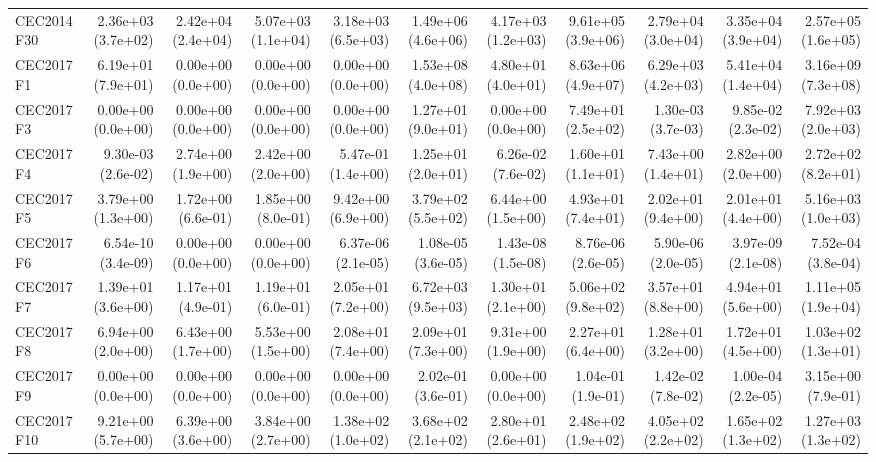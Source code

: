 \begin{longtable}{lrrrrrrrrrr}
CEC2014 F30 & 2.36e+03 (3.7e+02) & 2.42e+04 (2.4e+04) & 5.07e+03 (1.1e+04) & 3.18e+03 (6.5e+03) & 1.49e+06 (4.6e+06) & 4.17e+03 (1.2e+03) & 9.61e+05 (3.9e+06) & 2.79e+04 (3.0e+04) & 3.35e+04 (3.9e+04) & 2.57e+05 (1.6e+05) \\
CEC2017 F1 & 6.19e+01 (7.9e+01) & 0.00e+00 (0.0e+00) & 0.00e+00 (0.0e+00) & 0.00e+00 (0.0e+00) & 1.53e+08 (4.0e+08) & 4.80e+01 (4.0e+01) & 8.63e+06 (4.9e+07) & 6.29e+03 (4.2e+03) & 5.41e+04 (1.4e+04) & 3.16e+09 (7.3e+08) \\
CEC2017 F3 & 0.00e+00 (0.0e+00) & 0.00e+00 (0.0e+00) & 0.00e+00 (0.0e+00) & 0.00e+00 (0.0e+00) & 1.27e+01 (9.0e+01) & 0.00e+00 (0.0e+00) & 7.49e+01 (2.5e+02) & 1.30e-03 (3.7e-03) & 9.85e-02 (2.3e-02) & 7.92e+03 (2.0e+03) \\
CEC2017 F4 & 9.30e-03 (2.6e-02) & 2.74e+00 (1.9e+00) & 2.42e+00 (2.0e+00) & 5.47e-01 (1.4e+00) & 1.25e+01 (2.0e+01) & 6.26e-02 (7.6e-02) & 1.60e+01 (1.1e+01) & 7.43e+00 (1.4e+01) & 2.82e+00 (2.0e+00) & 2.72e+02 (8.2e+01) \\
CEC2017 F5 & 3.79e+00 (1.3e+00) & 1.72e+00 (6.6e-01) & 1.85e+00 (8.0e-01) & 9.42e+00 (6.9e+00) & 3.79e+02 (5.5e+02) & 6.44e+00 (1.5e+00) & 4.93e+01 (7.4e+01) & 2.02e+01 (9.4e+00) & 2.01e+01 (4.4e+00) & 5.16e+03 (1.0e+03) \\
CEC2017 F6 & 6.54e-10 (3.4e-09) & 0.00e+00 (0.0e+00) & 0.00e+00 (0.0e+00) & 6.37e-06 (2.1e-05) & 1.08e-05 (3.6e-05) & 1.43e-08 (1.5e-08) & 8.76e-06 (2.6e-05) & 5.90e-06 (2.0e-05) & 3.97e-09 (2.1e-08) & 7.52e-04 (3.8e-04) \\
CEC2017 F7 & 1.39e+01 (3.6e+00) & 1.17e+01 (4.9e-01) & 1.19e+01 (6.0e-01) & 2.05e+01 (7.2e+00) & 6.72e+03 (9.5e+03) & 1.30e+01 (2.1e+00) & 5.06e+02 (9.8e+02) & 3.57e+01 (8.8e+00) & 4.94e+01 (5.6e+00) & 1.11e+05 (1.9e+04) \\
CEC2017 F8 & 6.94e+00 (2.0e+00) & 6.43e+00 (1.7e+00) & 5.53e+00 (1.5e+00) & 2.08e+01 (7.4e+00) & 2.09e+01 (7.3e+00) & 9.31e+00 (1.9e+00) & 2.27e+01 (6.4e+00) & 1.28e+01 (3.2e+00) & 1.72e+01 (4.5e+00) & 1.03e+02 (1.3e+01) \\
CEC2017 F9 & 0.00e+00 (0.0e+00) & 0.00e+00 (0.0e+00) & 0.00e+00 (0.0e+00) & 0.00e+00 (0.0e+00) & 2.02e-01 (3.6e-01) & 0.00e+00 (0.0e+00) & 1.04e-01 (1.9e-01) & 1.42e-02 (7.8e-02) & 1.00e-04 (2.2e-05) & 3.15e+00 (7.9e-01) \\
CEC2017 F10 & 9.21e+00 (5.7e+00) & 6.39e+00 (3.6e+00) & 3.84e+00 (2.7e+00) & 1.38e+02 (1.0e+02) & 3.68e+02 (2.1e+02) & 2.80e+01 (2.6e+01) & 2.48e+02 (1.9e+02) & 4.05e+02 (2.2e+02) & 1.65e+02 (1.3e+02) & 1.27e+03 (1.3e+02) \\

\end{longtable}
